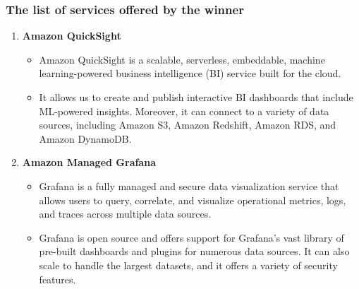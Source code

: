 \documentclass{article}
\begin{document}
\subsubsection{The list of services offered by the winner} \label{3_3_1}
\begin{enumerate}
    \item \textbf{Amazon QuickSight}
    \begin{itemize}
        \item Amazon QuickSight \cite{quicksight} is a  scalable, serverless, embeddable, machine learning-powered business intelligence (BI) service built for the cloud.
        \item It allows us to create and publish interactive BI dashboards that include ML-powered insights. Moreover, it can connect to a variety of data sources, including Amazon S3, Amazon Redshift, Amazon RDS, and Amazon DynamoDB.
    \end{itemize}
    \item \textbf{Amazon Managed Grafana}
    \begin{itemize}
        \item Grafana \cite{grafana} is a fully managed and secure data visualization service that allows users to query, correlate, and visualize operational metrics, logs, and traces across multiple data sources.
        \item Grafana is open source and offers support for Grafana’s vast library of pre-built dashboards and plugins for numerous data sources. It can also scale to handle the largest datasets, and it offers a variety of security features.
        

\end{itemize}
\end{enumerate}
\end{document}
